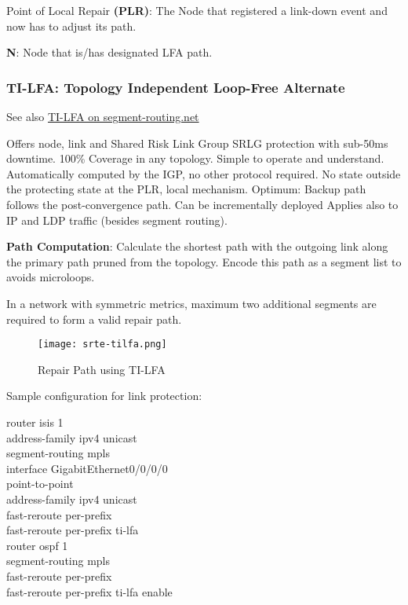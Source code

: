 \vspace{5mm}
Point of Local Repair \textbf{(PLR)}: The Node that registered a link-down event and now has to adjust its path.

\textbf{N}: Node that is/has designated LFA path.

\subsubsection{TI-LFA: Topology Independent Loop-Free Alternate}

See also \href{https://www.segment-routing.net/tutorials/2016-09-27-topology-independent-lfa-ti-lfa/}{TI-LFA on segment-routing.net}

Offers node, link and Shared Risk Link Group SRLG protection with sub-50ms downtime. 100\% Coverage in any topology. Simple to operate and understand.
 Automatically computed by the IGP, no other protocol required.
 No state outside the protecting state at the PLR, local mechanism.
 Optimum: Backup path follows the post-convergence path. 
 Can be incrementally deployed
 Applies also to IP and LDP traffic (besides segment routing).

 
\vspace{5mm} \noindent
\textbf{Path Computation}: Calculate the shortest path with the outgoing link along the primary path pruned from the topology. 
Encode this path as a segment list to avoids microloops.

In a network with symmetric metrics, maximum two additional segments are required to form a valid repair path.

\begin{figure}[h]
    \centering
    \texttt{[image: srte-tilfa.png]}
    \caption{Repair Path using TI-LFA}
\end{figure}


\vspace{5mm} \noindent
Sample configuration for link protection:

\vspace{1mm} \noindent
\ttfamily
\noindent
router isis 1 \\
\hspace*{1em}address-family ipv4 unicast \\
\hspace*{2em}segment-routing mpls \\

\noindent
interface GigabitEthernet0/0/0/0 \\
\hspace*{1em}point-to-point \\
\hspace*{1em}address-family ipv4 unicast \\
\hspace*{2em}fast-reroute per-prefix \\
\hspace*{2em}fast-reroute per-prefix ti-lfa \\

\noindent
router ospf 1 \\
\hspace*{1em}segment-routing mpls \\
\hspace*{2em}fast-reroute per-prefix \\
\hspace*{2em}fast-reroute per-prefix ti-lfa enable  \\

\rmfamily